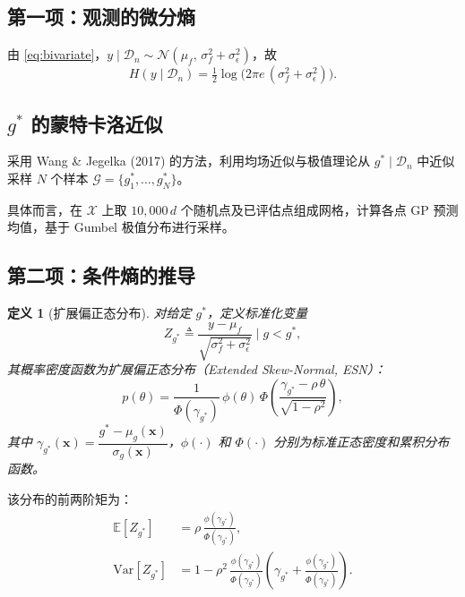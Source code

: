 \documentclass[11pt,a4paper]{article}
\newtheorem{definition}{定义}[section]
\newcommand{\bx}{\mathbf{x}}
\newcommand{\cX}{\mathcal{X}}
\newcommand{\cD}{\mathcal{D}}
\begin{document}
\subsection{第一项：观测的微分熵}

由 \eqref{eq:bivariate}，$y\mid\cD_n\sim\mathcal{N}(\mu_f,\,\sigma_f^2+\sigma_\epsilon^2)$，故
\begin{equation}\label{eq:term1}
  H(y\mid\cD_n) = \tfrac{1}{2}\log\bigl(2\pi e\,(\sigma_f^2+\sigma_\epsilon^2)\bigr).
\end{equation}

\subsection{$g^*$ 的蒙特卡洛近似}

采用 Wang \& Jegelka (2017) 的方法，利用均场近似与极值理论从 $g^*\mid\cD_n$ 中近似采样 $N$ 个样本
$\mathcal{G}=\{g_1^*,\ldots,g_N^*\}$。

具体而言，在 $\cX$ 上取 $10{,}000\,d$ 个随机点及已评估点组成网格，计算各点 GP 预测均值，基于 Gumbel 极值分布进行采样。

\subsection{第二项：条件熵的推导}

\begin{definition}[扩展偏正态分布]
对给定 $g^*$，定义标准化变量
\begin{equation}
  Z_{g^*} \triangleq \frac{y-\mu_f}{\sqrt{\sigma_f^2+\sigma_\epsilon^2}}\;\Big|\;g < g^*,
\end{equation}
其概率密度函数为扩展偏正态分布（Extended Skew-Normal, ESN）：
\begin{equation}\label{eq:esn-pdf}
  p(\theta) = \frac{1}{\Phi(\gamma_{g^*})}\,\phi(\theta)\,
  \Phi\!\left(\frac{\gamma_{g^*}-\rho\,\theta}{\sqrt{1-\rho^2}}\right),
\end{equation}
其中 $\gamma_{g^*}(\bx) = \dfrac{g^*-\mu_g(\bx)}{\sigma_g(\bx)}$，$\phi(\cdot)$ 和 $\Phi(\cdot)$ 分别为标准正态密度和累积分布函数。
\end{definition}

该分布的前两阶矩为：
\begin{align}
  \mathbb{E}[Z_{g^*}] &= \rho\,\frac{\phi(\gamma_{g^*})}{\Phi(\gamma_{g^*})}, \label{eq:esn-mean}\\
  \mathrm{Var}[Z_{g^*}] &= 1 - \rho^2\,\frac{\phi(\gamma_{g^*})}{\Phi(\gamma_{g^*})}\!\left(\gamma_{g^*}+\frac{\phi(\gamma_{g^*})}{\Phi(\gamma_{g^*})}\right). \label{eq:esn-var}
\end{align}
\end{document}
